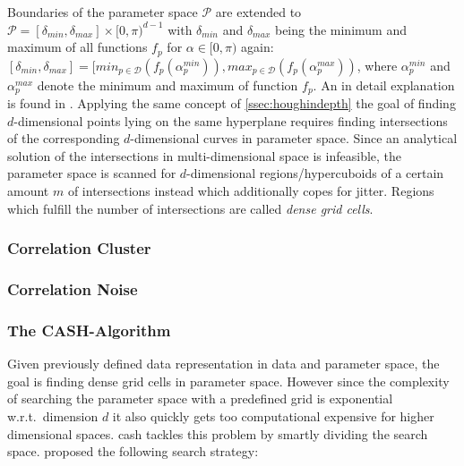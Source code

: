 Boundaries of the parameter space $\mathcal{P}$ are extended to $\mathcal{P} = [\delta_{min}, \delta_{max}]\times [0,\pi)^{d-1}$ with $\delta_{min}$ and $\delta_{max}$ being the minimum and maximum of all functions $f_p$ for $\alpha \in [0,\pi)$ again: $[\delta_{min}, \delta_{max}] = [min_{p \in \mathcal{D}}(f_p(\alpha_p^{min})), max_{p \in \mathcal{D}}(f_p(\alpha_p^{max}))$, where $\alpha_p^{min}$ and $\alpha_p^{max}$ denote the minimum and maximum of function $f_p$. An in detail explanation is found in \textcite{CASHachtert2008robust}.
Applying the same concept of \autoref{ssec:houghindepth} the goal of finding $d$-dimensional points lying on the same hyperplane requires finding intersections of the corresponding $d$-dimensional curves in parameter space. Since an analytical solution of the intersections in multi-dimensional space is infeasible, the parameter space is scanned for $d$-dimensional regions/hypercuboids of a certain amount $m$ of intersections instead which additionally copes for jitter. Regions which fulfill the number of intersections are called \textit{dense grid cells}.

\subsubsection*{Correlation Cluster}

\subsubsection*{Correlation Noise}

\subsubsection*{The CASH-Algorithm}
Given previously defined data representation in data and parameter space, the goal is finding dense grid cells in parameter space. However since the complexity of searching the parameter space with a predefined grid is exponential w.r.t.\ dimension $d$ it also quickly gets too computational expensive for higher dimensional spaces. \gls{cash} tackles this problem by smartly dividing the search space. \citeauthor{CASHachtert2008robust} proposed the following search strategy:
\vspace{5mm}

